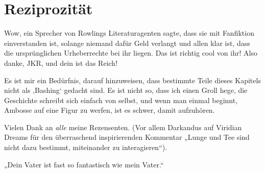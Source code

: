 \chapter{Reziprozität}

\begin{chapterOpeningAuthorNote}
Wow, ein Sprecher von Rowlings Literaturagenten sagte, dass sie mit Fanfiktion einverstanden ist, solange niemand dafür Geld verlangt und allen klar ist, dass die ursprünglichen Urheberrechte bei ihr liegen. Das ist richtig cool von ihr! Also danke, JKR, und dein ist das Reich!

Es ist mir ein Bedürfnis, darauf hinzuweisen, dass bestimmte Teile dieses Kapitels nicht als ‚Bashing‘ gedacht sind. Es ist nicht so, dass ich einen Groll hege, die Geschichte schreibt sich einfach von selbst, und wenn man einmal beginnt, Ambosse auf eine Figur zu werfen, ist es schwer, damit aufzuhören.


Vielen Dank an \emph{alle} meine Rezensenten. (Vor allem Darkandus auf Viridian Dreams für den überraschend inspirierenden Kommentar „Lunge und Tee sind nicht dazu bestimmt, miteinander zu interagieren“).
\end{chapterOpeningAuthorNote}
\begin{chapterOpeningQuote}
„Dein Vater ist fast so fantastisch wie mein Vater.“
\end{chapterOpeningQuote}

